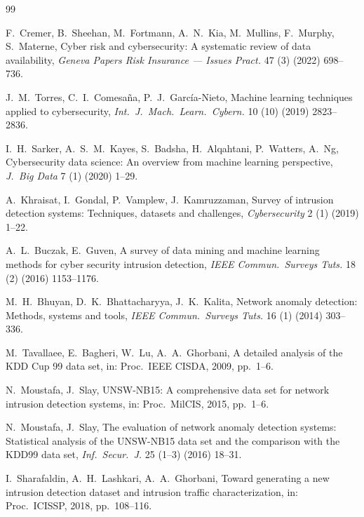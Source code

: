 \documentclass[preprint,12pt,authoryear]{elsarticle}
\begin{document}
\begin{thebibliography}{99}

F.~Cremer, B.~Sheehan, M.~Fortmann, A.~N.~Kia, M.~Mullins, F.~Murphy, S.~Materne,
Cyber risk and cybersecurity: A systematic review of data availability,
\textit{Geneva Papers Risk Insurance --- Issues Pract.} 47 (3) (2022) 698--736.

J.~M.~Torres, C.~I.~Comesa\~na, P.~J.~Garc\'ia-Nieto, Machine learning techniques
applied to cybersecurity, \textit{Int.\ J.\ Mach.\ Learn.\ Cybern.} 10 (10) (2019)
2823--2836.

I.~H.~Sarker, A.~S.~M.~Kayes, S.~Badsha, H.~Alqahtani, P.~Watters, A.~Ng,
Cybersecurity data science: An overview from machine learning perspective,
\textit{J.\ Big Data} 7 (1) (2020) 1--29.

A.~Khraisat, I.~Gondal, P.~Vamplew, J.~Kamruzzaman, Survey of intrusion detection
systems: Techniques, datasets and challenges, \textit{Cybersecurity} 2 (1) (2019)
1--22.

A.~L.~Buczak, E.~Guven, A survey of data mining and machine learning methods for
cyber security intrusion detection, \textit{IEEE Commun.\ Surveys Tuts.} 18 (2)
(2016) 1153--1176.

M.~H.~Bhuyan, D.~K.~Bhattacharyya, J.~K.~Kalita, Network anomaly detection:
Methods, systems and tools, \textit{IEEE Commun.\ Surveys Tuts.} 16 (1) (2014)
303--336.

M.~Tavallaee, E.~Bagheri, W.~Lu, A.~A.~Ghorbani, A detailed analysis of the KDD
Cup 99 data set, in: Proc.\ IEEE CISDA, 2009, pp.~1--6.

N.~Moustafa, J.~Slay, UNSW-NB15: A comprehensive data set for network intrusion
detection systems, in: Proc.\ MilCIS, 2015, pp.~1--6.

N.~Moustafa, J.~Slay, The evaluation of network anomaly detection systems:
Statistical analysis of the UNSW-NB15 data set and the comparison with the KDD99
data set, \textit{Inf.\ Secur.\ J.} 25 (1--3) (2016) 18--31.

I.~Sharafaldin, A.~H.~Lashkari, A.~A.~Ghorbani, Toward generating a new intrusion
detection dataset and intrusion traffic characterization, in: Proc.\ ICISSP, 2018,
pp.~108--116.


\end{thebibliography}
\end{document}
